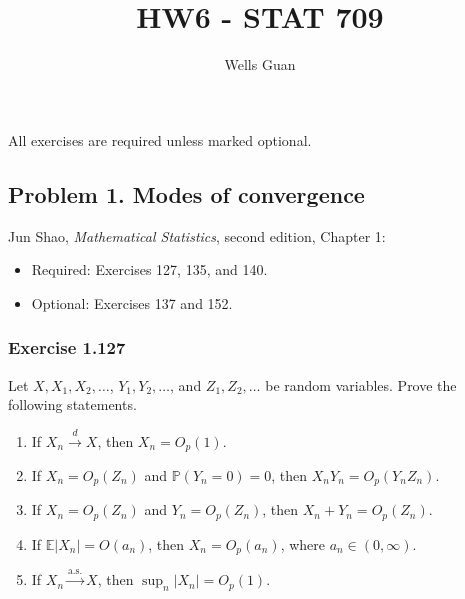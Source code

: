 \documentclass[lang=en,11pt,a4paper,citestyle=authoryear]{elegantpaper}
\title{HW6 - STAT 709}
\author{Wells Guan}
\newcommand{\E}{\mathbb{E}}
\renewcommand{\P}{\mathbb{P}}
\begin{document}
\maketitle

\noindent All exercises are required unless marked optional.


\subsection*{Problem 1. Modes of convergence}
Jun Shao, \textit{Mathematical Statistics}, second edition, Chapter 1:
\begin{itemize}[leftmargin=*]
\item Required: Exercises 127, 135, and 140.
\item Optional: Exercises 137 and 152.
\end{itemize}

\subsubsection*{Exercise 1.127}
Let $X,X_1,X_2,\ldots$, $Y_1,Y_2,\ldots$, and $Z_1,Z_2,\ldots$
be random variables. Prove the following statements.
\begin{enumerate}[label=(\alph*),leftmargin=*]
\item If $X_n\xrightarrow{d}X$, then $X_n=O_p(1)$.
\item If $X_n=O_p(Z_n)$ and $\P(Y_n=0)=0$, then
$X_nY_n=O_p(Y_nZ_n)$.
\item If $X_n=O_p(Z_n)$ and $Y_n=O_p(Z_n)$, then
$X_n+Y_n=O_p(Z_n)$.
\item If $\E|X_n|=O(a_n)$, then $X_n=O_p(a_n)$, where
$a_n\in(0,\infty)$.
\item If $X_n\xrightarrow{\mathrm{a.s.}}X$, then
$\sup_n|X_n|=O_p(1)$.
\end{enumerate}
\end{document}

